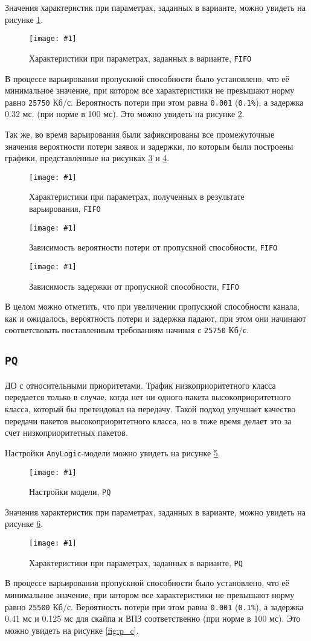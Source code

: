 \documentclass[12pt, a4paper]{article}
\newcommand{\figc}[4]{
  \begin{figure}[H]
  \begin{center}
    \texttt{[image: \#1]}
    \caption{#2}
    \label{fig:#3}
  \end{center}
  \end{figure}
}
\begin{document}
Значения характеристик при параметрах, заданных в варианте, можно увидеть
на рисунке \ref{fig:f_v}.

\figc{bp/C4E10BP}{Характеристики при параметрах, заданных в варианте, \texttt{FIFO}}{f_v}{1.0}

В процессе варьирования пропускной способности было установлено, что
её минимальное значение, при котором все характеристики не превышают
норму равно \texttt{25750} Кб/с. Вероятность потери при этом равна
\texttt{0.001} (\texttt{0.1\%}), а задержка 0.32 мс. (при норме в 100 мс).
Это можно увидеть на рисунке \ref{fig:f_c}.

Так же, во время варьирования были зафиксированы
все промежуточные значения вероятности потери заявок и задержки, по которым
были построены графики, представленные на рисунках \ref{fig:f_l} и \ref{fig:f_d}.

\figc{bp/C25_75E10BP}{Характеристики при параметрах, полученных в результате варьирования, \texttt{FIFO}}{f_c}{1.0}
\figc{charts/bp_loss}{Зависимость вероятности потери от пропускной способности, \texttt{FIFO}}{f_l}{0.8}
\figc{charts/bp_delay}{Зависимость задержки от пропускной способности, \texttt{FIFO}}{f_d}{0.8}

В целом можно отметить, что при увеличении пропускной способности канала, как
и ожидалось, вероятность потери и задержка падают, при этом они начинают соответсвовать
поставленным требованиям начиная с \texttt{25750} Кб/с.

\subsection{\texttt{PQ}}

ДО с относительными приоритетами. Трафик низкоприоритетного класса передается
только в случае, когда нет ни одного пакета высокоприоритетного класса, который
бы претендовал на передачу. Такой подход улучшает качество передачи пакетов
высокоприоритетного класса, но в тоже время делает это за счет
низкоприоритетных пакетов.

Настройки \texttt{AnyLogic}-модели можно увидеть
на рисунке \ref{fig:p_set}.

\figc{op/settings}{Настройки модели, \texttt{PQ}}{p_set}{1.0}

Значения характеристик при параметрах, заданных в варианте, можно увидеть
на рисунке \ref{fig:p_v}.

\figc{op/C4E10OP}{Характеристики при параметрах, заданных в варианте, \texttt{PQ}}{p_v}{1.0}

В процессе варьирования пропускной способности было установлено, что
её минимальное значение, при котором все характеристики не превышают
норму равно \texttt{25500} Кб/с. Вероятность потери при этом равна
\texttt{0.001} (\texttt{0.1\%}), а задержка 0.41 мс и 0.125 мс
для скайпа и ВПЗ соответственно (при норме в 100 мс).
Это можно увидеть на рисунке \ref{fig:p_c}.
\end{document}

